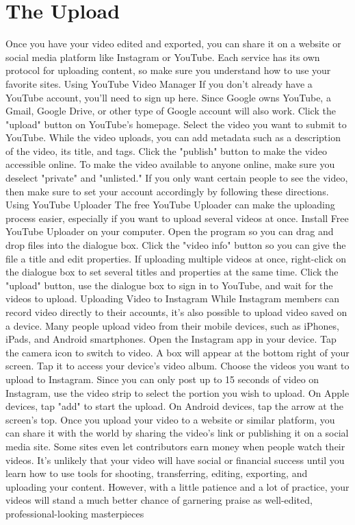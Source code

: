\section{The Upload}
Once you have your video edited and exported, you can share it on a website or social media platform like Instagram or YouTube. Each service has its own protocol for uploading content, so make sure you understand how to use your favorite sites.
Using YouTube Video Manager
If you don't already have a YouTube account, you'll need to sign up here. Since Google owns YouTube, a Gmail, Google Drive, or other type of Google account will also work.
Click the "upload" button on YouTube's homepage.
Select the video you want to submit to YouTube. While the video uploads, you can add metadata such as a description of the video, its title, and tags.
Click the "publish" button to make the video accessible online.
To make the video available to anyone online, make sure you deselect "private" and "unlisted." If you only want certain people to see the video, then make sure to set your account accordingly by following these directions.
Using YouTube Uploader
The free YouTube Uploader can make the uploading process easier, especially if you want to upload several videos at once.
Install Free YouTube Uploader on your computer.
Open the program so you can drag and drop files into the dialogue box.
Click the "video info" button so you can give the file a title and edit properties.
If uploading multiple videos at once, right-click on the dialogue box to set several titles and properties at the same time.
Click the "upload" button, use the dialogue box to sign in to YouTube, and wait for the videos to upload.
Uploading Video to Instagram
While Instagram members can record video directly to their accounts, it's also possible to upload video saved on a device. Many people upload video from their mobile devices, such as iPhones, iPads, and Android smartphones.
Open the Instagram app in your device.
Tap the camera icon to switch to video.
A box will appear at the bottom right of your screen. Tap it to access your device's video album.
Choose the videos you want to upload to Instagram.
Since you can only post up to 15 seconds of video on Instagram, use the video strip to select the portion you wish to upload.
On Apple devices, tap "add" to start the upload. On Android devices, tap the arrow at the screen's top.
Once you upload your video to a website or similar platform, you can share it with the world by sharing the video's link or publishing it on a social media site. Some sites even let contributors earn money when people watch their videos.
It's unlikely that your video will have social or financial success until you learn how to use tools for shooting, transferring, editing, exporting, and uploading your content. However, with a little patience and a lot of practice, your videos will stand a much better chance of garnering praise as well-edited, professional-looking masterpieces
